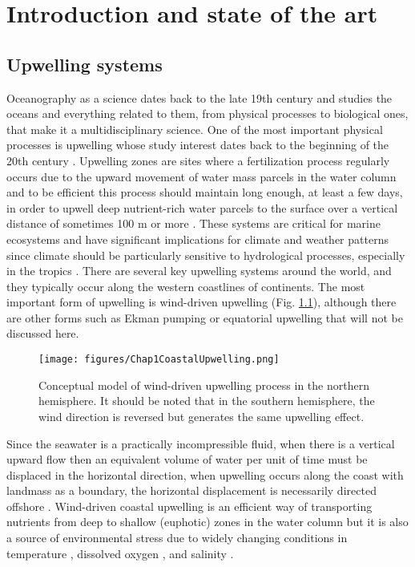 \chapter{Introduction and state of the art}\label{Chap1}

\section{Upwelling systems}\label{Chap1UpweSyst}

Oceanography as a science dates back to the late 19th century \citep{Wust1964,Mill2012,LlopCowe2014} and studies the oceans and everything related to them, from physical processes to biological ones, that make it a multidisciplinary science. One of the most important physical processes is upwelling whose study interest dates back to the beginning of the 20th century \citep{Ogil1912,Murp1920}. Upwelling zones are sites where a fertilization process regularly occurs due to the upward movement of water mass parcels in the water column and to be efficient this process should maintain long enough, at least a few days, in order to upwell deep nutrient-rich water parcels to the surface over a vertical distance of sometimes 100 m or more \citep{Marg1978}. These systems are critical for marine ecosystems and have significant implications for climate and weather patterns since climate should be particularly sensitive to hydrological processes, especially in the tropics \citep{Webs1994}. There are several key upwelling systems around the world, and they typically occur along the western coastlines of continents. The most important form of upwelling is wind-driven upwelling (Fig. \ref{Chap1CoastalUpwelling}), although there are other forms such as Ekman pumping or equatorial upwelling that will not be discussed here.\\

\begin{figure}[ht]
	\centering
	\texttt{[image: figures/Chap1CoastalUpwelling.png]}
	\caption{Conceptual model of wind-driven upwelling process in the northern hemisphere. It should be noted that in the southern hemisphere, the wind direction is reversed but generates the same upwelling effect.}
	\label{Chap1CoastalUpwelling}
\end{figure}

Since the seawater is a practically incompressible fluid, when there is a vertical upward flow then an equivalent volume of water per unit of time must be displaced in the horizontal direction, when upwelling occurs along the coast with landmass as a boundary, the horizontal displacement is necessarily directed offshore \citep{KampCap2}. Wind-driven coastal upwelling is an efficient way of transporting nutrients from deep to shallow (euphotic) zones in the water column \citep{MessChav2015,MessChav2017} but it is also a source of environmental stress due to widely changing conditions in temperature \citep{CastWang2014}, dissolved oxygen \citep{Scul2010}, and salinity \citep{XuanHuan2012}.\\


